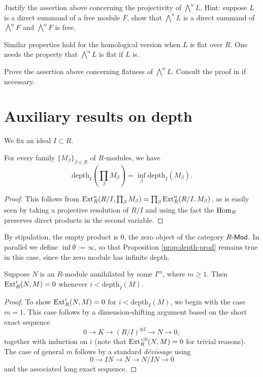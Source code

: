 \begin{exercise}
	Justify the assertion above concerning the projectivity of $\bigwedge^n L$. Hint: suppose $L$ is a direct summand of a free module $F$, show that $\bigwedge^n L$ is a direct summand of $\bigwedge^n F$ and $\bigwedge^n F$ is free.
\end{exercise}

Similar properties hold for the homological version when $L$ is flat over $R$. One needs the property that $\bigwedge^n L$ is flat if $L$ is.
\begin{exercise}
	Prove the assertion above concerning flatness of $\bigwedge^n L$. Consult the proof in \cite[p.15]{Bour80} if necessary.
\end{exercise}

\section{Auxiliary results on depth}
We fix an ideal $I \subset R$.
\begin{proposition}\label{prop:depth-prod}
	For every family $\{M_\beta\}_{\beta \in \mathcal{B}}$ of $R$-modules, we have
	\[ \mathrm{depth}_I\left(\prod_\beta M_\beta \right) = \inf_\beta \mathrm{depth}_I(M_\beta). \]
\end{proposition}
\begin{proof}
	This follows from $\operatorname{Ext}^n_R(R/I, \prod_\beta M_\beta) = \prod_\beta \operatorname{Ext}^n_R(R/I, M_\beta)$, as is easily seen by taking a projective resolution of $R/I$ and using the fact the $\operatorname{Hom}_R$ preserves direct products in the second variable.
\end{proof}

\begin{remark}
	By stipulation, the empty product is $0$, the zero object of the category $R\text{-}\mathsf{Mod}$. In parallel we define $\inf\emptyset := \infty$, so that Proposition \ref{prop:depth-prod} remains true in this case, since the zero module has infinite depth.
\end{remark}

\begin{proposition}
	Suppose $N$ is an $R$-module annihilated by some $I^m$, where $m \geq 1$. Then $\operatorname{Ext}^i_R(N,M)=0$ whenever $i < \mathrm{depth}_I(M)$.
\end{proposition}
\begin{proof}
	To show $\operatorname{Ext}^i_R(N,M)=0$ for $i < \text{depth}_I(M)$, we begin with the case $m=1$. This case follows by a dimension-shifting argument based on the short exact sequence
	\[ 0 \to K \to (R/I)^{\oplus I} \to N \to 0, \]
	together with induction on $i$ (note that $\operatorname{Ext}^{<0}_R(N,M)=0$ for trivial reasons). The case of general $m$ follows by a standard \emph{dévissage} using
	\[ 0 \to IN \to N \to N/IN \to 0 \]
	and the associated long exact sequence.
\end{proof}

